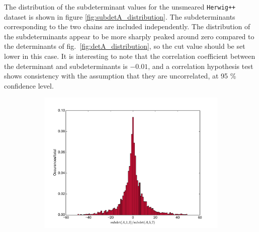 \documentclass[twoside,english]{uiofysmaster}
\begin{document}
The distribution of the subdeterminant values for the unsmeared {\tt Herwig++} dataset is shown in figure \ref{fig:subdetA_distribution}. The subdeterminants corresponding to the two chains are included independently. The distribution of the subdeterminants appear to be more sharply peaked around zero compared to the determinants of fig.\ \ref{fig:detA_distribution}, so the cut value should be set lower in this case. It is interesting to note that the correlation coefficient between the determinant and subdeterminants is $-0.01$, and a correlation hypothesis test shows consistency with the assumption that they are uncorrelated, at 95 \% confidence level. 
\begin{figure}[hbt]
	\centering
	\begin{subfigure}[b]{0.6\textwidth}
		\includegraphics[width=\textwidth]{figures/improving_combinatorics/subdetA1_histogram_nosmear_trim50.pdf} 
		\caption{ }
		\label{fig:subdetA_distribution_a}
	\end{subfigure}


\end{figure}
\end{document}
